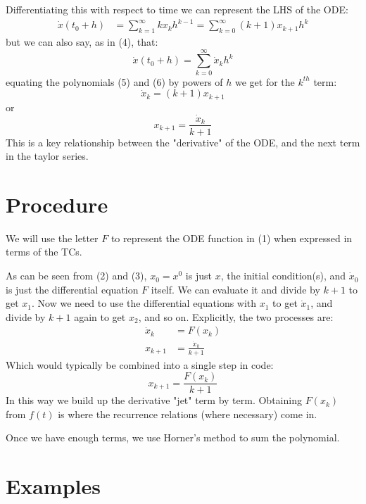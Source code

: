 \documentclass[11pt]{article}
\begin{document}
Differentiating this with respect to time we can represent the LHS of the ODE:
\begin{equation}
\begin{aligned}
\dot{x}(t_0 + h) &= \sum_{k=1}^{\infty} k x_kh^{k-1} = \sum_{k=0}^{\infty} (k + 1) x_{k+1}h^k
\end{aligned}
\end{equation}
but we can also say, as in (4), that:
\begin{equation}
\dot{x}(t_0 + h) = \sum_{k=0}^{\infty} \dot{x}_kh^k
\end{equation}
equating the polynomials (5) and (6) by powers of $h$ we get for the $k^{th}$ term:
\begin{equation}
\dot{x}_k = (k + 1) x_{k+1}
\end{equation}
or
\begin{equation}
x_{k+1} = \frac{\dot{x}_k} {k + 1} 
\end{equation}
This is a key relationship between the "derivative" of the ODE, and the next term in the taylor series.
\section{Procedure}
We will use the letter $F$ to represent the ODE function in (1) when expressed in terms of the TCs.

As can be seen from (2) and (3), $x_0 = x^0$ is just $x$, the initial condition(s), and $\dot{x}_0$ is just the differential equation $F$ itself.
We can evaluate it and divide by $k + 1$ to get $x_1$.
Now we need to use the differential equations with $x_1$ to get $\dot{x}_1$, and divide by $k + 1$ again to get $x_2$, and so on.  Explicitly, the two processes are:
\begin{equation}
\begin{aligned}
\dot{x}_k &= F(x_k) \\
x_{k+1} &= \frac{\dot{x}_k} {k + 1}
\end{aligned}
\end{equation}
Which would typically be combined into a single step in code:
\begin{equation}
x_{k+1} = \frac{F(x_k)} {k + 1}
\end{equation}
In this way we build up the derivative "jet" term by term.
Obtaining $F(x_k)$ from $f(t)$ is where the recurrence relations (where necessary) come in.

Once we have enough terms, we use Horner's method to sum the polynomial.
\section{Examples}
\end{document}
